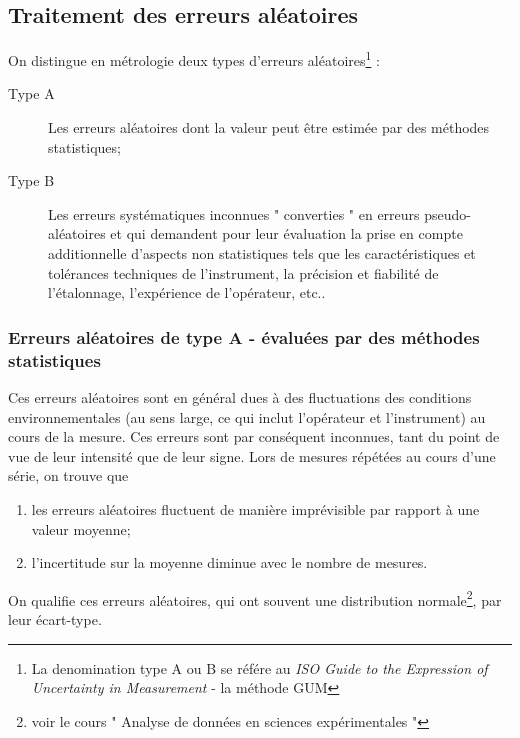 \subsection{Traitement des erreurs aléatoires}

On distingue en métrologie deux types d'erreurs aléatoires\footnote{La denomination type A ou B se référe au \textit{ISO Guide to the Expression of Uncertainty in Measurement} - la méthode GUM} :
\begin{description}
    \item[Type A] Les erreurs aléatoires dont la valeur peut être estimée par des méthodes statistiques;
    \item[Type B] Les erreurs systématiques inconnues " converties " en erreurs pseudo-aléatoires et qui demandent pour leur évaluation la prise en compte additionnelle d'aspects non statistiques tels que les caractéristiques et tolérances techniques de l'instrument, la précision et fiabilité de l'étalonnage, l'expérience de l'opérateur, etc..
\end{description}

\subsubsection{Erreurs aléatoires de type A - évaluées par des méthodes statistiques}

Ces erreurs aléatoires sont en général dues à des fluctuations des conditions environnementales (au sens large, ce qui inclut l'opérateur et l'instrument) au cours de la mesure. Ces erreurs sont par conséquent inconnues, tant du point de vue de leur intensité que de leur signe. Lors de mesures répétées au cours d'une série, on trouve que
\begin{enumerate}
    \item les  erreurs aléatoires fluctuent de manière imprévisible par rapport à une valeur moyenne;
    \item l'incertitude sur la moyenne diminue avec le nombre de mesures.
\end{enumerate}

On qualifie ces erreurs aléatoires, qui ont souvent une distribution normale\footnote{voir le cours " Analyse de données en sciences expérimentales "}, par leur écart-type.

